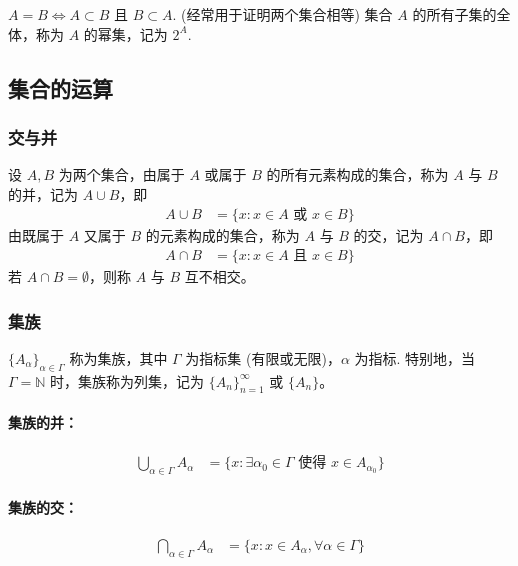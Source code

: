 \documentclass[../../main.tex]{subfiles}
\begin{document}
\begin{remark}
\(A = B \Longleftrightarrow A \subset B\) 且 \(B \subset A\). (经常用于证明两个集合相等)
集合 \(A\) 的所有子集的全体，称为 \(A\) 的幂集，记为 \(2^A\). 
\end{remark}

\subsection{集合的运算}

\subsubsection*{交与并}

设 \(A, B\) 为两个集合，由属于 \(A\) 或属于 \(B\) 的所有元素构成的集合，称为 \(A\) 与 \(B\) 的并，记为 \(A \cup B\)，即
\begin{align*}
A \cup B &= \{x : x \in A \text{ 或 } x \in B\}
\end{align*}
由既属于 \(A\) 又属于 \(B\) 的元素构成的集合，称为 \(A\) 与 \(B\) 的交，记为 \(A \cap B\)，即
\begin{align*}
A \cap B &= \{x : x \in A \text{ 且 } x \in B\}
\end{align*}
若 \(A \cap B = \emptyset\)，则称 \(A\) 与 \(B\) 互不相交。

\subsubsection*{集族}

\(\{A_{\alpha}\}_{\alpha \in \varGamma}\) 称为集族，其中 \(\varGamma\) 为指标集 (有限或无限)，\(\alpha\) 为指标. 特别地，当 \(\varGamma = \mathbb{N}\) 时，集族称为列集，记为 \(\{A_n\}_{n = 1}^{\infty}\) 或 \(\{A_n\}\)。

\paragraph{集族的并：}
\begin{align*}
\bigcup_{\alpha \in \varGamma} A_{\alpha} &= \{x : \exists \alpha_0 \in \varGamma \text{ 使得 } x \in A_{\alpha_0}\}
\end{align*}

\paragraph{集族的交：}
\begin{align*}
\bigcap_{\alpha \in \varGamma} A_{\alpha} &= \{x : x \in A_{\alpha}, \forall \alpha \in \varGamma\}
\end{align*}
\end{document}
